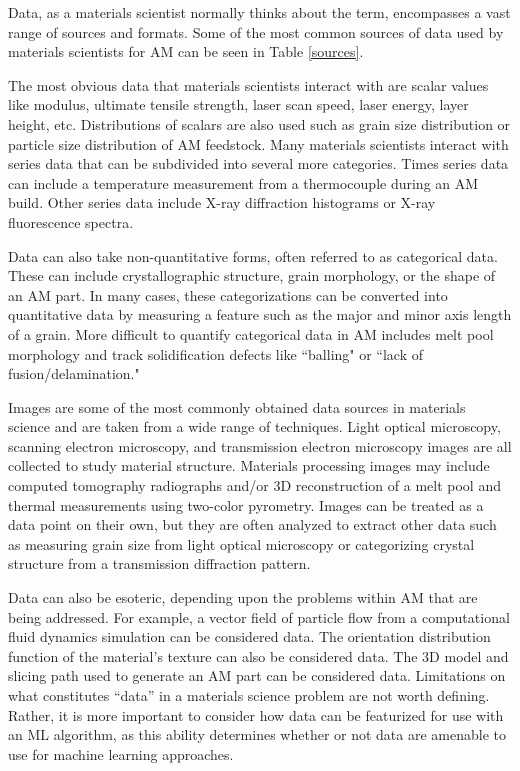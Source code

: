 	


Data, as a materials scientist normally thinks about the term, encompasses a vast range of sources and formats. Some of the most common sources of data used by materials scientists for AM can be seen in Table \ref{sources}. 

The most obvious data that materials scientists interact with are scalar values like modulus, ultimate tensile strength, laser scan speed, laser energy, layer height, etc. Distributions of scalars are also used such as grain size distribution or particle size distribution of AM feedstock. Many materials scientists interact with series data that can be subdivided into several more categories. Times series data can include a temperature measurement from a thermocouple during an AM build. Other series data include X-ray diffraction histograms or X-ray fluorescence spectra. 

Data can also take non-quantitative forms, often referred to as categorical data. These can include crystallographic structure, grain morphology, or the shape of an AM part. In many cases, these categorizations can be converted into quantitative data by measuring a feature such as the major and minor axis length of a grain. More difficult to quantify categorical data in AM includes melt pool morphology and track solidification defects like ``balling" or ``lack of fusion/delamination."

Images are some of the most commonly obtained data sources in materials science and are taken from a wide range of techniques. Light optical microscopy, scanning electron microscopy, and transmission electron microscopy images are all collected to study material structure. Materials processing images may include computed tomography radiographs and/or 3D reconstruction of a melt pool and thermal measurements using two-color pyrometry. Images can be treated as a data point on their own, but they are often analyzed to extract other data such as measuring grain size from light optical microscopy or categorizing crystal structure from a transmission diffraction pattern. 

Data can also be esoteric, depending upon the problems within AM that are being addressed. For example, a vector field of particle flow from a computational fluid dynamics simulation can be considered data. The orientation distribution function of the material's texture can also be considered data. The 3D model and slicing path used to generate an AM part can be considered data. Limitations on what constitutes ``data'' in a materials science problem are not worth defining. Rather, it is more important to consider how data can be featurized for use with an ML algorithm, as this ability determines whether or not data are amenable to use for machine learning approaches.